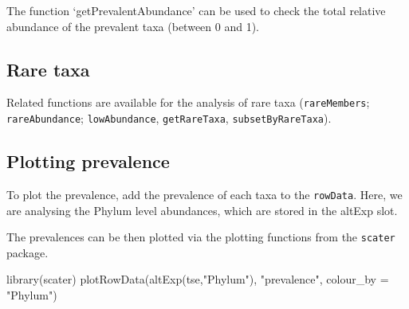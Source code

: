 \documentclass[
]{book}
\newenvironment{Shaded}{\begin{snugshade}}{\end{snugshade}}
\newcommand{\AttributeTok}[1]{\textcolor[rgb]{0.77,0.63,0.00}{#1}}
\newcommand{\ConstantTok}[1]{\textcolor[rgb]{0.00,0.00,0.00}{#1}}
\newcommand{\DecValTok}[1]{\textcolor[rgb]{0.00,0.00,0.81}{#1}}
\newcommand{\FunctionTok}[1]{\textcolor[rgb]{0.00,0.00,0.00}{#1}}
\newcommand{\NormalTok}[1]{#1}
\newcommand{\OtherTok}[1]{\textcolor[rgb]{0.56,0.35,0.01}{#1}}
\newcommand{\SpecialCharTok}[1]{\textcolor[rgb]{0.00,0.00,0.00}{#1}}
\newcommand{\StringTok}[1]{\textcolor[rgb]{0.31,0.60,0.02}{#1}}
\begin{document}
The function `getPrevalentAbundance' can be used to check the total
relative abundance of the prevalent taxa (between 0 and 1).

\hypertarget{rare-taxa}{%
\subsection{Rare taxa}\label{rare-taxa}}

Related functions are available for the analysis of rare taxa
(\texttt{rareMembers}; \texttt{rareAbundance}; \texttt{lowAbundance}, \texttt{getRareTaxa},
\texttt{subsetByRareTaxa}).

\hypertarget{plotting-prevalence}{%
\subsection{Plotting prevalence}\label{plotting-prevalence}}

To plot the prevalence, add the prevalence of each taxa to the
\texttt{rowData}. Here, we are analysing the Phylum level abundances, which
are stored in the altExp slot.

\begin{Shaded}
\end{Shaded}

The prevalences can be then plotted via the plotting functions from
the \texttt{scater} package.

\begin{Shaded}
\begin{Highlighting}[]
\FunctionTok{library}\NormalTok{(scater)}
\FunctionTok{plotRowData}\NormalTok{(}\FunctionTok{altExp}\NormalTok{(tse,}\StringTok{"Phylum"}\NormalTok{), }\StringTok{"prevalence"}\NormalTok{, }\AttributeTok{colour\_by =} \StringTok{"Phylum"}\NormalTok{)}
\end{Highlighting}
\end{Shaded}
\end{document}
